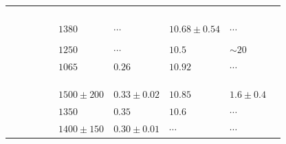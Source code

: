 \documentclass[fleqn,usenatbib,usedcolumn,useAMS]{mnras}
\begin{document}
\begin{table}
{\begin{tabular}{@{}llllllllll@{}}
			\citet{1962AJ.....67..491R}                                     &  &  &  &  &              &               &                &           &  \\
			\citet{1965CoBos..32....0T}                                     &  &  &  &  &              &               &                &           &  \\
			\citet{1965AJ.....70...19E}                                     &  &  &  &  &              &               &                &           &  \\
			\citet{1966CoBos..34....1T}                                     &  &  &  &  &              &               &                &           &  \\
			\citet{1967MNRAS.135..377G}                                     &  &  &  &  & $1380$       & $\cdots$      & $10.68\pm0.54$ & $\cdots$  &  \\
			\citet{1968PhDT........29E}                                     &  &  &  &  &              &               &                &           &  \\
			\citet{1968ArA.....5....1L}                                     &  &  &  &  & $1250$       & $\cdots$      & $10.5$         & $\sim 20$ &  \\
			\citet{1971AAS....4..241B}                                      &  &  &  &  & $1065$       & $0.26$        & $10.92$        & $\cdots$  &  \\
			\citet{1972BAICz..23..126A}                                     &  &  &  &  &              &               &                &           &  \\
			\citet{1973AuJPh..26..853T}                                     &  &  &  &  &              &               &                &           &  \\
			\citet{1975AA....39..477V}                                     &  &  &  &  &              &               &                &           &  \\
			\citet{1978MNRAS.182..607F} &                   &             &              &          & $1500\pm200$ & $0.33\pm0.02$ & $10.85$                       & $1.6\pm0.4$ &  \\
			\citet{1978MNRAS.184..661L}                                     &  &  &  &  & $1350$       & $0.35$        & $10.6$         & $\cdots$  &  \\
			\citet{1985AA...151..391T}                                      &  &  &  &  & $1400\pm150$ & $0.30\pm0.01$ & $\cdots$       & $\cdots$  &  \\

\end{tabular}}
\end{table}
\end{document}
